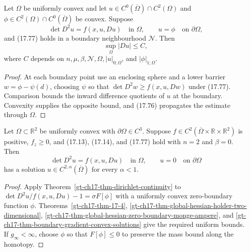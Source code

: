 \begin{theorem}
\label{gt-ch17-thm-boundary-gradient-convex-solutions}
Let $\Omega$ be uniformly convex and let
$u\in C^0(\overline\Omega)\cap C^2(\Omega)$ and
$\phi\in C^2(\Omega)\cap C^0(\overline\Omega)$ be convex.  Suppose
\begin{equation}\tag{17.78}
\det D^2u=f(x,u,Du)\quad\text{in }\Omega,
\qquad u=\phi\quad\text{on }\partial\Omega,
\end{equation}
and (17.77) holds in a boundary neighbourhood $\mathcal N$.  Then
\begin{equation}\tag{17.79}
\sup_\Omega|Du|\le C,
\end{equation}
where $C$ depends on $n,\mu,\beta,\mathcal N,\Omega,|u|_{0;\Omega}$, and
$|\phi|_{1;\Omega}$.
\end{theorem}
\begin{proof}
\sketch At each boundary point use an enclosing sphere and a lower barrier
$w=\phi-\psi(d)$, choosing $\psi$ so that
$\det D^2w\ge f(x,u,Dw)$ under (17.77).  Comparison bounds the inward
difference quotients of $u$ at the boundary.  Convexity supplies the opposite
bound, and (17.76) propagates the estimate through $\Omega$.
\end{proof}

\begin{theorem}
\label{gt-ch17-thm-two-dimensional-monge-ampere-dirichlet}
Let $\Omega\subset\mathbb R^2$ be uniformly convex with
$\partial\Omega\in C^3$.  Suppose
$f\in C^2(\overline\Omega\times\mathbb R\times\mathbb R^2)$ is positive,
$f_z\ge0$, and (17.13), (17.14), and (17.77) hold with $n=2$ and $\beta=0$.
Then
\begin{equation}\tag{17.80}
\det D^2u=f(x,u,Du)\quad\text{in }\Omega,
\qquad u=0\quad\text{on }\partial\Omega
\end{equation}
has a solution $u\in C^{2,\alpha}(\overline\Omega)$ for every $\alpha<1$.
\end{theorem}
\begin{proof}
\sketch Apply Theorem~\ref{gt-ch17-thm-dirichlet-continuity} to
$\det D^2u/f(x,u,Du)-1=\sigma F[\phi]$ with a uniformly convex
zero-boundary function $\phi$.  Theorems~\ref{gt-ch17-thm-17-4},
\ref{gt-ch17-thm-global-hessian-holder-two-dimensional},
\ref{gt-ch17-thm-global-hessian-zero-boundary-monge-ampere}, and
\ref{gt-ch17-thm-boundary-gradient-convex-solutions} give
the required uniform bounds.  If $g_\infty<\infty$, choose $\phi$ so that
$F[\phi]\le0$ to preserve the mass bound along the homotopy.
\end{proof}

